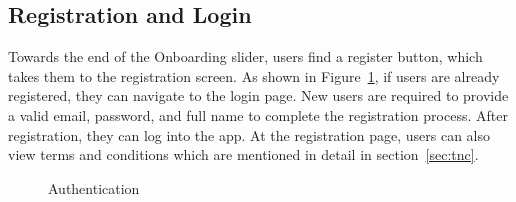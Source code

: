 \subsection{Registration and Login}
Towards the end of the Onboarding slider, users find a register button, which takes them to the registration screen. As shown in Figure~\ref{fig:authentication-screen}, if users are already registered, they can navigate to the login page. New users are required to provide a valid email, password, and full name to complete the registration process. After registration, they can log into the app. At the registration page, users can also view terms and conditions which are mentioned in detail in section~\ref{sec:tnc}.
  \begin{figure}[H]
	\centering
	\hspace{5pt}
	\caption{Authentication}
	\label{fig:authentication-screen}
\end{figure}
